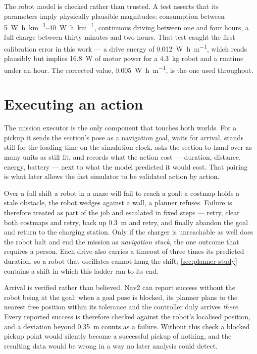 The robot model is checked rather than trusted. A test asserts that its parameters imply physically
plausible magnitudes: consumption between \SIrange{5}{40}{\watt\hour\per\kilo\metre}, continuous
driving between one and four hours, a full charge between thirty minutes and two hours. That test
caught the first calibration error in this work --- a drive energy of
\SI{0.012}{\watt\hour\per\metre}, which reads plausibly but implies \SI{16.8}{\watt} of motor power
for a \SI{4.3}{\kilo\gram} robot and a runtime under an hour. The corrected value,
\SI{0.005}{\watt\hour\per\metre}, is the one used throughout.

\section{Executing an action}
\label{sec:executor}

The mission executor is the only component that touches both worlds. For a pickup it sends the
section's pose as a navigation goal, waits for arrival, stands still for the loading time on the
simulation clock, asks the section to hand over as many units as still fit, and records what the
action cost --- duration, distance, energy, battery --- next to what the model predicted it would
cost. That pairing is what later allows the fast simulator to be validated action by action.

Over a full shift a robot in a maze will fail to reach a goal: a costmap holds a stale obstacle, the
robot wedges against a wall, a planner refuses. Failure is therefore treated as part of the job and
escalated in fixed steps --- retry, clear both costmaps and retry, back up \SI{0.3}{\metre} and
retry, and finally abandon the goal and return to the charging station. Only if the charger is
unreachable as well does the robot halt and end the mission as \emph{navigation stuck}, the one
outcome that requires a person. Each drive also carries a timeout of three times its predicted
duration, so a robot that oscillates cannot hang the shift; \cref{sec:planner-study} contains a
shift in which this ladder ran to its end.

Arrival is verified rather than believed. Nav2 can report success without the robot being at the
goal: when a goal pose is blocked, its planner plans to the nearest free position within its
tolerance and the controller duly arrives \emph{there}. Every reported success is therefore checked
against the robot's localised position, and a deviation beyond \SI{0.35}{\metre} counts as a
failure. Without this check a blocked pickup point would silently become a successful pickup of
nothing, and the resulting data would be wrong in a way no later analysis could detect.

